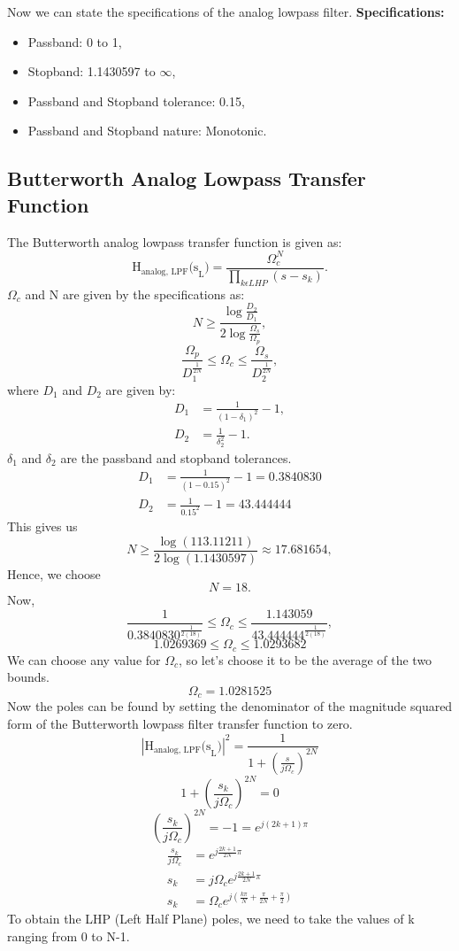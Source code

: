 \documentclass[12pt]{article}
\begin{document}
Now we can state the specifications of the analog lowpass filter.
\newline
\hline
\vspace{10pt}
\textbf{Specifications:}
\begin{itemize}
    \item Passband: 0 to 1,
    \item Stopband: 1.1430597 to  $\infty$,
    \item Passband and Stopband tolerance: 0.15,
    \item Passband and Stopband nature: Monotonic.
\end{itemize}
\hline

\subsection{Butterworth Analog Lowpass Transfer Function}
The Butterworth analog lowpass transfer function is given as:
\[\text{H}_{\text{analog, LPF}}\text{(s}_\text{L}\text{)} = \frac{\Omega_c^N}{\prod_{k\epsilon LHP}(s - s_k)}.\]
$\Omega_c$ and N are given by the specifications as:
\[N \geq \frac{\log{\frac{D_2}{D_1}}}{2\log{\frac{\Omega_s}{\Omega_p}}},\]
\[\frac{\Omega_p}{D_1^\frac{1}{2N}} \leq \Omega_c \leq \frac{\Omega_s}{D_2^\frac{1}{2N}},\]
where $D_1$ and $D_2$ are given by:
\begin{align*}
    D_1 &= \frac{1}{(1 - \delta_1)^2} - 1,\\
    D_2 &= \frac{1}{\delta_2^2} - 1.
\end{align*}
$\delta_1$ and $\delta_2$ are the passband and stopband tolerances.
\begin{align*}
    D_1 &= \frac{1}{(1 - 0.15)^2} - 1 = 0.3840830\\
    D_2 &= \frac{1}{0.15^2} - 1 = 43.444444
\end{align*}
This gives us
\[N \geq \frac{\log(113.11211)}{2\log(1.1430597)} \approx 17.681654,\]
Hence, we choose\[N = 18.\]
Now,
\[\frac{1}{0.3840830^\frac{1}{2(18)}} \leq \Omega_c \leq \frac{1.143059}{43.444444^\frac{1}{2(18)}},\]
\[1.0269369 \leq \Omega_c \leq 1.0293682\]
We can choose any value for $\Omega_c$, so let's choose it to be the average of the two bounds.
\[\Omega_c = 1.0281525\]
Now the poles can be found by setting the denominator of the magnitude squared form of the Butterworth lowpass filter transfer function to zero.
\[|\text{H}_{\text{analog, LPF}}\text{(s}_\text{L}\text{)}|^2 = \frac{1}{1 + (\frac{s}{j\Omega_c})^{2N}}\]
\[1 + (\frac{s_k}{j\Omega_c})^{2N} = 0\]
\[(\frac{s_k}{j\Omega_c})^{2N} = -1 = e^{j(2k+1)\pi}\]
\begin{align*}
    \frac{s_k}{j\Omega_c} &= e^{j\frac{2k+1}{2N}\pi}\\
    s_k &= j\Omega_ce^{j\frac{2k+1}{2N}\pi}\\
    s_k &= \Omega_ce^{j(\frac{k\pi}{N}+\frac{\pi}{2N}+\frac{\pi}{2})}
\end{align*}
To obtain the LHP (Left Half Plane) poles, we need to take the values of k ranging from 0 to N-1.
\end{document}
